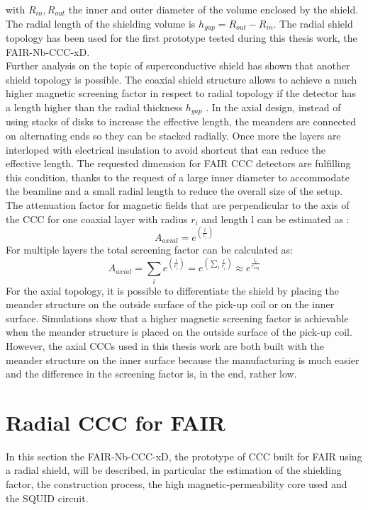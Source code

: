 \documentclass[12pt,a4paper]{report}
\begin{document}
        with $R_{in},R_{out}$ the inner and outer diameter of the volume enclosed by the shield. The radial length of the shielding volume is $h_{gap}= R_{out}-R_{in}$. The radial shield topology has been used for the first prototype tested during this thesis work, the FAIR-Nb-CCC-xD.\\
        Further analysis on the topic of superconductive shield has shown that another shield topology is possible. The coaxial shield structure allows to achieve a much higher magnetic screening factor in respect to radial topology if the detector has a length higher than the radial thickness $h_{gap}$ \cite{Marsic}\cite{CorelessCCC}. In the axial design, instead of using stacks of disks to increase the effective length, the meanders are connected on alternating ends so they can be stacked radially. Once more the layers are interloped with electrical insulation to avoid shortcut that can reduce the effective length. The requested dimension for FAIR CCC detectors are fulfilling this condition, thanks to the request of a large inner diameter to accommodate the beamline and a small radial length to reduce the overall size of the setup.\\
        The attenuation factor for magnetic fields that are perpendicular to the axis of the CCC for one coaxial layer with radius $r_i$ and length l can be estimated as \cite{Marsic} \cite{GROHMANN_shield}:
        \begin{equation}
        	A_{axial} = e^{(\frac{l}{r_i})}
        \end{equation}
        For multiple layers the total screening factor can be calculated as:
        \begin{equation}
        	A_{axial} = \sum_i  e^{(\frac{l}{r_i})} = e^{(\sum_i\frac{l}{r_i})} \approx e^{\frac{l_e}{r_{avg}}}
        \end{equation}
        For the axial topology, it is possible to differentiate the shield by placing the meander structure on the outside surface of the pick-up coil or on the inner surface. Simulations show that a higher magnetic screening factor is achievable when the meander structure is placed on the outside surface of the pick-up coil. However, the axial CCCs used in this thesis work are both built with the meander structure on the inner surface because the manufacturing is much easier and the difference in the screening factor is, in the end, rather low.
        
        \section{Radial CCC for FAIR} 
        In this section the FAIR-Nb-CCC-xD, the prototype of CCC built for FAIR using a radial shield, will be described, in particular the estimation of the shielding factor, the construction process, the high magnetic-permeability core used and the SQUID circuit.
\end{document}
